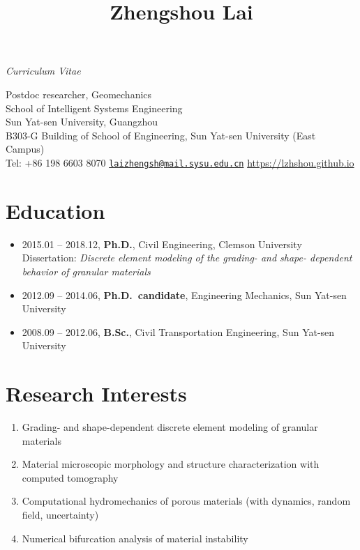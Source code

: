 \documentclass[11pt,]{elsarticle}
\title{Zhengshou Lai}
\author{}
\date{}
\providecommand{\tightlist}{%
  \setlength{\itemsep}{0pt}\setlength{\parskip}{0pt}}
\begin{document}
\maketitle

\begin{center}
\textit{Curriculum Vitae}
\end{center}

\begingroup

\center

Postdoc researcher, Geomechanics\\
School of Intelligent Systems Engineering\\
Sun Yat-sen University, Guangzhou\\
B303-G Building of School of Engineering, Sun Yat-sen University (East
Campus)\\
Tel: +86 198 6603 8070 \textbar{}
\href{mailto:laizhengsh@mail.sysu.edu.cn}{\nolinkurl{laizhengsh@mail.sysu.edu.cn}}
\textbar{} \url{https://lzhshou.github.io}

\endgroup

\hypertarget{education}{%
\section{Education}\label{education}}

\begin{itemize}
\tightlist
\item
  2015.01 -- 2018.12, \textbf{Ph.D.}, Civil Engineering, Clemson
  University\\
  Dissertation: \emph{Discrete element modeling of the grading- and
  shape- dependent behavior of granular materials}
\item
  2012.09 -- 2014.06, \textbf{Ph.D.~candidate}, Engineering Mechanics,
  Sun Yat-sen University
\item
  2008.09 -- 2012.06, \textbf{B.Sc.}, Civil Transportation Engineering,
  Sun Yat-sen University
\end{itemize}

\hypertarget{research-interests}{%
\section{Research Interests}\label{research-interests}}

\begin{enumerate}
\def\labelenumi{\arabic{enumi}.}
\tightlist
\item
  Grading- and shape-dependent discrete element modeling of granular
  materials
\item
  Material microscopic morphology and structure characterization with
  computed tomography
\item
  Computational hydromechanics of porous materials (with dynamics,
  random field, uncertainty)
\item
  Numerical bifurcation analysis of material instability
\end{enumerate}
\end{document}
